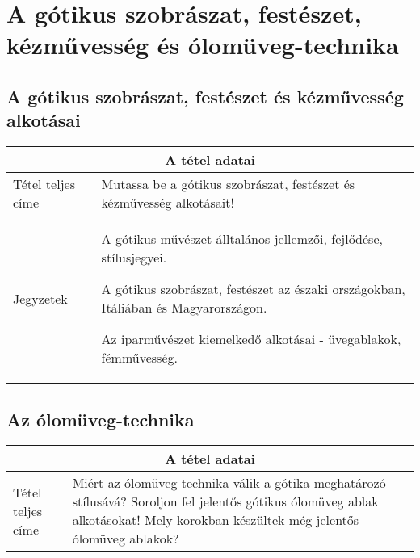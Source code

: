 \chapter{A gótikus szobrászat, festészet, kézművesség és ólomüveg-technika} %
\label{ch:7_gotikus_alkotasok}

\section{A gótikus szobrászat, festészet és kézművesség alkotásai}

\begin{center}
	\begin{longtable}{ | p{} | p{} | }
		
		\hline
		\multicolumn{2}{|c|}{\textbf{A tétel adatai}}
		\\ \hline
		
		\hline
		Tétel teljes címe
		&
		Mutassa be a gótikus szobrászat, festészet és kézművesség alkotásait!
		\\ \hline
		
		Jegyzetek &
		\begin{compactitem}
			\item A gótikus művészet álltalános jellemzői, fejlődése, stílusjegyei.
			\item A gótikus szobrászat, festészet az északi országokban, Itáliában és Magyarországon.
			\item Az iparművészet kiemelkedő alkotásai - üvegablakok, fémművesség.
		\end{compactitem}
		\\\hline
		
	\end{longtable}
\end{center}

\cleardoublepage


\section{Az ólomüveg-technika}

\begin{center}
	\begin{longtable}{ | p{} | p{} | }
		
		\hline
		\multicolumn{2}{|c|}{\textbf{A tétel adatai}}
		\\ \hline
		
		\hline
		Tétel teljes címe 
		&
		Miért az ólomüveg-technika válik a gótika meghatározó stílusává? Soroljon fel jelentős gótikus ólomüveg ablak alkotásokat! Mely korokban készültek még jelentős ólomüveg ablakok?
		\\ \hline
		
	\end{longtable}
\end{center}
